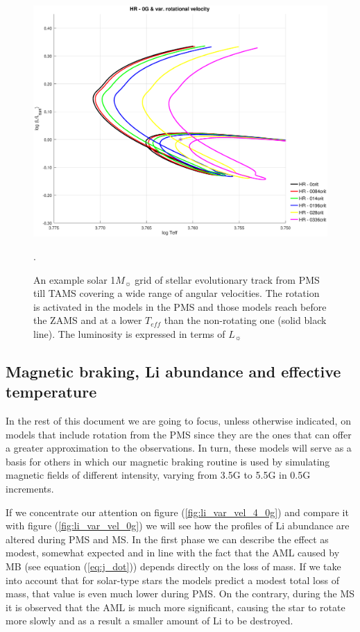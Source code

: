 \documentclass[fleqn,usenatbib]{mnras}
\begin{document}
\begin{figure}
	\includegraphics[trim = 30mm 15mm 20mm 15mm, clip,width=\columnwidth]{figures/hr_var_vel_0_0g_z1.eps}
    \caption{An example solar 1$M_{\sun}$ grid of stellar evolutionary track from PMS till TAMS covering a wide range of angular velocities. The rotation is activated in the models in the PMS and those models reach before the ZAMS and at a lower $T_{eff}$ than the non-rotating one (solid black line). The luminosity is expressed in terms of $L_{\sun}$}.
    \label{fig:hr_var_vel_0g}
\end{figure}

\subsection{Magnetic braking, Li abundance and effective temperature}
In the rest of this document we are going to focus, unless otherwise indicated, on models that include rotation from the PMS since they are the ones that can offer a greater approximation to the observations. In turn, these models will serve as a basis for others in which our magnetic braking routine is used by simulating magnetic fields of different intensity, varying from 3.5G to 5.5G in 0.5G increments.\par

If we concentrate our attention on figure (\ref{fig:li_var_vel_4_0g}) and compare it with figure (\ref{fig:li_var_vel_0g}) we will see how the profiles of Li abundance are altered during PMS and MS. In the first phase we can describe the effect as modest, somewhat expected and in line with the fact that the AML caused by MB (see equation (\ref{eq:j_dot})) depends directly on the loss of mass. If we take into account that for solar-type stars the models predict a modest total loss of mass, that value is even much lower during PMS. On the contrary, during the MS it is observed that the AML is much more significant, causing the star to rotate more slowly and as a result a smaller amount of Li to be destroyed.\par
\end{document}
